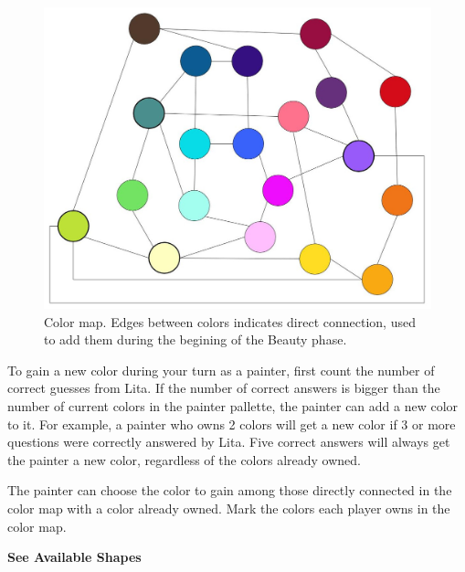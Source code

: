 \documentclass[twocolumn]{article}
\newcommand{\lvl}[1]{\vspace{0.5cm}\Large{\textbf{#1}}\vspace{0.2cm}}
\begin{document}
\begin{figure}[th!]
\centering
\includegraphics[scale=0.25]{color_map.jpg}
\caption{Color map. Edges between colors indicates direct connection, used to add them during the begining of the Beauty phase.}
\label{fig:color_map}
\end{figure}

To gain a new color during your turn as a painter, first count the number of correct guesses from Lita. If the number of correct answers is bigger than the number of current colors in the painter pallette, the painter can add a new color to it. For example, a painter who owns 2 colors will get a new color if 3 or more questions were correctly answered by Lita. Five correct answers will always get the painter a new color, regardless of the colors already owned.

The painter can choose the color to gain among those directly connected in the color map with a color already owned. Mark the colors each player owns in the color map.


\vspace{1cm}
\lvl{See Available Shapes}
\end{document}
